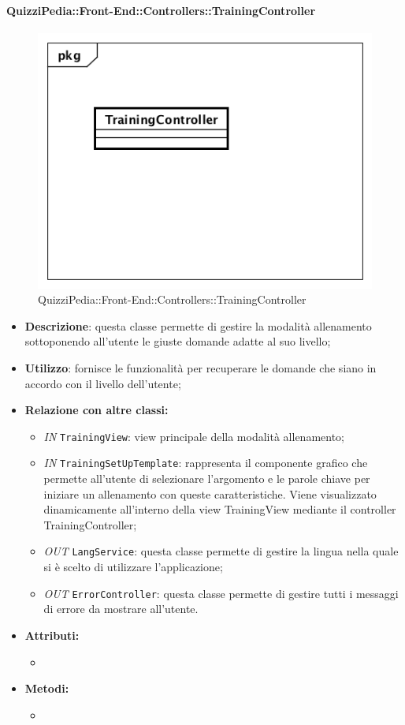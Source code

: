 \paragraph{QuizziPedia::Front-End::Controllers::TrainingController}
\begin{figure}
	\centering
	\includegraphics[scale=0.45]{UML/Classi/Front-End/QuizziPedia_Front-end_Controller_TrainingController.png}
	\caption{QuizziPedia::Front-End::Controllers::TrainingController}
\end{figure}
\begin{itemize}
	\item \textbf{Descrizione}: questa classe permette di gestire la modalità allenamento sottoponendo all'utente le giuste domande adatte al suo livello;
	\item \textbf{Utilizzo}: fornisce le funzionalità per recuperare le domande che siano in accordo con il livello dell'utente;
	\item \textbf{Relazione con altre classi:}
	\begin{itemize}
		\item \textit{IN} \texttt{TrainingView}: view principale della modalità allenamento;
		\item \textit{IN} \texttt{TrainingSetUpTemplate}: rappresenta il componente grafico che permette all'utente di selezionare l'argomento e le parole chiave per iniziare un allenamento con queste caratteristiche. Viene visualizzato dinamicamente all'interno della view TrainingView mediante il controller TrainingController;
		\item \textit{OUT} \texttt{LangService}: questa classe permette di gestire la lingua nella quale si è scelto di utilizzare l'applicazione;
		\item \textit{OUT} \texttt{ErrorController}: questa classe permette di gestire tutti i messaggi di errore da mostrare all'utente.
	\end{itemize}
	\item \textbf{Attributi:}
	\begin{itemize}
		\item 
	\end{itemize}
	\item \textbf{Metodi:}
	\begin{itemize}
		\item 
	\end{itemize}
\end{itemize}

